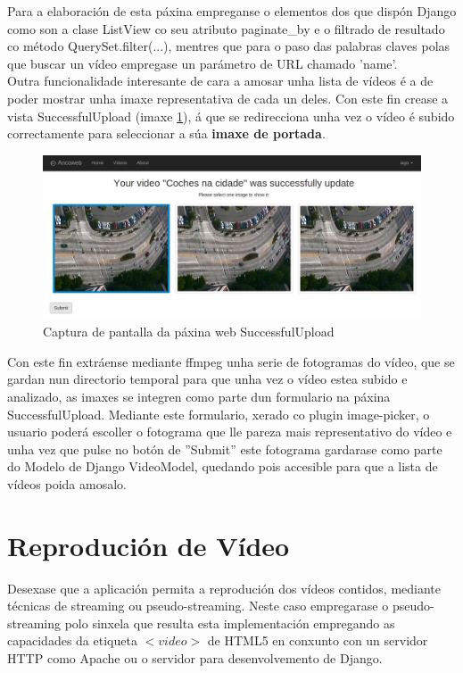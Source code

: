     Para a elaboración de esta páxina empreganse o elementos dos que dispón Django como son a
    clase ListView co seu atributo paginate\_by e o filtrado de resultado co método 
    QuerySet.filter(...), mentres que para o paso das palabras claves polas que buscar un vídeo
    empregase un parámetro de URL chamado 'name'.\\
    
    Outra funcionalidade interesante de cara a amosar unha lista de vídeos é a de poder mostrar unha
    imaxe representativa de cada un deles. Con este fin crease a vista SuccessfulUpload (imaxe
    \ref{fig:SuccessfulUploadScreen}), á que se redirecciona unha vez o vídeo é subido correctamente
    para seleccionar a súa \textbf{imaxe de portada}.
    
    \begin{figure}[htp]
    \begin{center}
        \includegraphics[scale=0.35]{figures/SuccessfulUploadScreen.png}
        \caption{Captura de pantalla da páxina web SuccessfulUpload}
    \label{fig:SuccessfulUploadScreen}
    \end{center}
    \end{figure}
    
    Con este fin extráense mediante ffmpeg unha serie de fotogramas do vídeo, que se gardan nun
    directorio temporal para que unha vez o vídeo estea subido e analizado, as imaxes se integren 
    como parte dun formulario na páxina SuccessfulUpload. Mediante este formulario, xerado co plugin
    image-picker\cite{ImagePickerPage}, o usuario poderá escoller o fotograma que lle pareza mais
    representativo do vídeo e unha vez que pulse no botón de ''Submit'' este fotograma gardarase
    como parte do Modelo de Django VideoModel, quedando pois accesible para que a lista de vídeos 
    poida amosalo.
    
	
\section{Reprodución de Vídeo}
    Desexase que a aplicación permita a reprodución dos vídeos contidos, mediante técnicas de
    streaming ou pseudo-streaming. Neste caso empregarase o pseudo-streaming polo sinxela que
    resulta esta implementación empregando as capacidades da etiqueta $<video>$ de HTML5 en conxunto
    con un servidor HTTP como Apache ou o servidor para desenvolvemento de Django.


